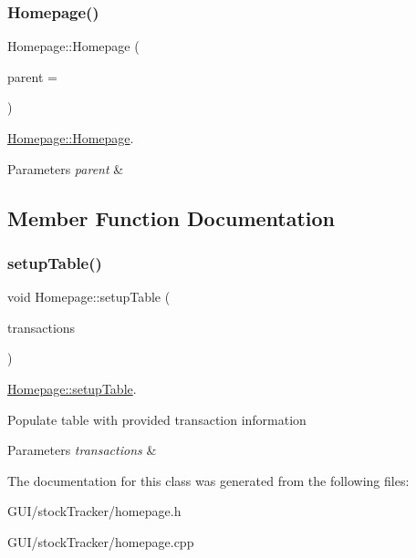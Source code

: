 \subsubsection{\texorpdfstring{Homepage()}{Homepage()}}
{\footnotesize\ttfamily Homepage\+::\+Homepage (\begin{DoxyParamCaption}\item[{Q\+Widget $\ast$}]{parent = {} }\end{DoxyParamCaption})}



\mbox{\hyperlink{class_homepage_a7fd9acfe5e1e29c3f00118315fabac53}{Homepage\+::\+Homepage}}. 


\begin{DoxyParams}{Parameters}
{\em parent} & \\
\hline
\end{DoxyParams}


\subsection{Member Function Documentation}
\mbox{\label{class_homepage_a8eeedb7e3e7b6144d7878e9525aad0ab}} 
\subsubsection{\texorpdfstring{setup\+Table()}{setupTable()}}
{\footnotesize\ttfamily void Homepage\+::setup\+Table (\begin{DoxyParamCaption}\item[{std\+::vector$<$ \mbox{\hyperlink{class_transaction_type}{Transaction\+Type}} $>$}]{transactions }\end{DoxyParamCaption})}



\mbox{\hyperlink{class_homepage_a8eeedb7e3e7b6144d7878e9525aad0ab}{Homepage\+::setup\+Table}}. 

Populate table with provided transaction information


\begin{DoxyParams}{Parameters}
{\em transactions} & \\
\hline
\end{DoxyParams}


The documentation for this class was generated from the following files\+:\begin{DoxyCompactItemize}
\item 
G\+U\+I/stock\+Tracker/homepage.\+h\item 
G\+U\+I/stock\+Tracker/homepage.\+cpp\end{DoxyCompactItemize}
